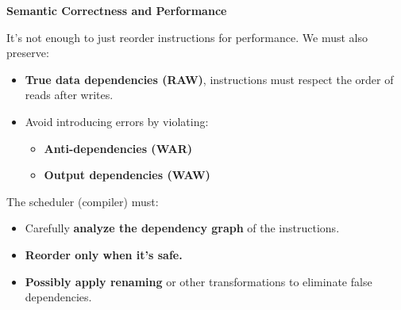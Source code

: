 \highspace
\begin{flushleft}
    \textcolor{Red2}{ \textbf{Semantic Correctness and Performance}}
\end{flushleft}
It's not enough to just reorder instructions for performance. We must also preserve:
\begin{itemize}
    \item \textbf{True data dependencies (RAW)}, instructions must respect the order of reads after writes.
    \item Avoid introducing errors by violating:
    \begin{itemize}
        \item \textbf{Anti-dependencies (WAR)}
        \item \textbf{Output dependencies (WAW)}
    \end{itemize}
\end{itemize}
The scheduler (compiler) must:
\begin{itemize}[label=\textcolor{Green3}{}]
    \item Carefully \textbf{analyze the dependency graph} of the instructions.
    \item \textbf{Reorder only when it's safe.}
    \item \textbf{Possibly apply renaming} or other transformations to eliminate false dependencies.
\end{itemize}